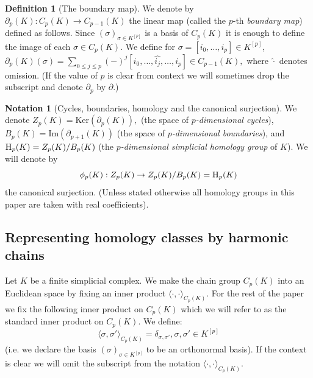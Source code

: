 \documentclass[11pt]{amsart}
\theoremstyle{theorem}
\theoremstyle{remark}
\theoremstyle{definition}
\newtheorem{definition}{Definition}[section]
\newtheorem{notation}{Notation}[section]
\newcommand{\sqbracket}[1]{[#1]}
\newcommand {\la}   {{\langle}}
\newcommand {\ra}   {{\rangle}}
\newcommand {\Ker}      {\mathrm{Ker}}
\newcommand{\HH}  {\mbox{\rm H}}
\begin{document}
\begin{definition}[The boundary map]
\label{def:boundary-map}
We denote by $\partial_p(K): C_p(K) \rightarrow C_{p-1}(K)$ the 
linear map (called the $p$-th \emph{boundary map})  defined as follows. Since 
$\left(\sigma \right)_{\sigma \in K^{\sqbracket{p}}}$ is a basis of $C_p(K)$ it is enough to define the image of each $\sigma \in C_p(K)$. 
We define for $\sigma = [i_0,\ldots,i_p] \in K^{\sqbracket{p}}$,
$
\partial_p(K)(\sigma) = \sum_{0\leq j \leq p} (-)^j [i_0,\ldots, \widehat{i_j}, \ldots,i_p] \in C_{p-1}(K),
$
where $\widehat{\cdot}$ denotes omission. (If the value of $p$ is clear from context we will sometimes drop the subscript and denote $\partial_p$ by $\partial$.)
\end{definition}

\begin{notation}[Cycles, boundaries, homology and the canonical surjection]
We denote 
$
Z_p(K) = \Ker(\partial_p(K)),
$
(the space of \emph{$p$-dimensional cycles}),
$
B_p(K) = \mathrm{Im}(\partial_{p+1}(K))
$
(the space of \emph{$p$-dimensional boundaries}),
and
$\HH_p(K) = Z_p(K)/B_p(K)$
(the \emph{$p$-dimensional simplicial homology group} of $K$).
We will denote by 
\[
\phi_p(K):Z_p(K) \rightarrow Z_p(K)/B_p(K) =  \HH_p(K)
\]
the canonical surjection. 
(Unless stated otherwise all homology groups in this paper are taken with real coefficients).
\end{notation}






\subsection{Representing homology classes by harmonic chains} 
Let $K$ be a finite simplicial complex.
We make the chain group $C_p(K)$ into an Euclidean space by fixing an inner product $\la \cdot,\cdot\ra_{C_p(K)}$. 
For the rest of the paper we fix the following inner product on $C_p(K)$ which we will    
refer to as the standard inner product on $C_p(K)$.
We define:
\begin{equation}
\label{eqn:standard}
\la \sigma, \sigma'\ra_{C_p(K)} = \delta_{\sigma,\sigma'},  \sigma,   \sigma' \in K^{\sqbracket{p}}
\end{equation}
(i.e. we declare the basis  $\left(\sigma \right)_{\sigma \in K^{\sqbracket{p}}}$ to be an orthonormal basis).
If the context is clear we will omit the subscript from the notation  $\la \cdot,\cdot\ra_{C_p(K)}$.
\end{document}
